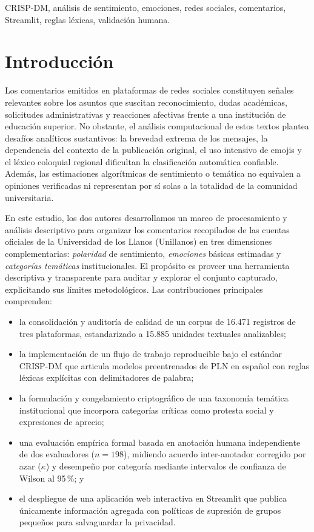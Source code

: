 \documentclass[conference]{IEEEtran}
\newcommand{\pc}{\,\%}
\begin{document}
\begin{IEEEkeywords}
CRISP-DM, an\'alisis de sentimiento, emociones, redes sociales, comentarios, Streamlit, reglas l\'exicas, validaci\'on humana.
\end{IEEEkeywords}

\section{Introducci\'on}
Los comentarios emitidos en plataformas de redes sociales constituyen se\~nales relevantes sobre los asuntos que suscitan reconocimiento, dudas acad\'emicas, solicitudes administrativas y reacciones afectivas frente a una instituci\'on de educaci\'on superior. No obstante, el an\'alisis computacional de estos textos plantea desaf\'ios anal\'iticos sustantivos: la brevedad extrema de los mensajes, la dependencia del contexto de la publicaci\'on original, el uso intensivo de emojis y el l\'exico coloquial regional dificultan la clasificaci\'on autom\'atica confiable. Adem\'as, las estimaciones algor\'itmicas de sentimiento o tem\'atica no equivalen a opiniones verificadas ni representan por s\'i solas a la totalidad de la comunidad universitaria.

En este estudio, los dos autores desarrollamos un marco de procesamiento y an\'alisis descriptivo para organizar los comentarios recopilados de las cuentas oficiales de la Universidad de los Llanos (Unillanos) en tres dimensiones complementarias: \emph{polaridad} de sentimiento, \emph{emociones} b\'asicas estimadas y \emph{categor\'ias tem\'aticas} institucionales. El prop\'osito es proveer una herramienta descriptiva y transparente para auditar y explorar el conjunto capturado, explicitando sus l\'imites metodol\'ogicos. Las contribuciones principales comprenden:
\begin{itemize}
\item la consolidaci\'on y auditor\'ia de calidad de un corpus de 16.471 registros de tres plataformas, estandarizado a 15.885 unidades textuales analizables;
\item la implementaci\'on de un flujo de trabajo reproducible bajo el est\'andar CRISP-DM que articula modelos preentrenados de PLN en espa\~nol con reglas l\'exicas expl\'icitas con delimitadores de palabra;
\item la formulaci\'on y congelamiento criptogr\'afico de una taxonom\'ia tem\'atica institucional que incorpora categor\'ias cr\'iticas como protesta social y expresiones de aprecio;
\item una evaluaci\'on emp\'irica formal basada en anotaci\'on humana independiente de dos evaluadores ($n = 198$), midiendo acuerdo inter-anotador corregido por azar ($\kappa$) y desempe\~no por categor\'ia mediante intervalos de confianza de Wilson al 95\pc; y
\item el despliegue de una aplicaci\'on web interactiva en Streamlit que publica \'unicamente informaci\'on agregada con pol\'iticas de supresi\'on de grupos peque\~nos para salvaguardar la privacidad.
\end{itemize}
\end{document}
